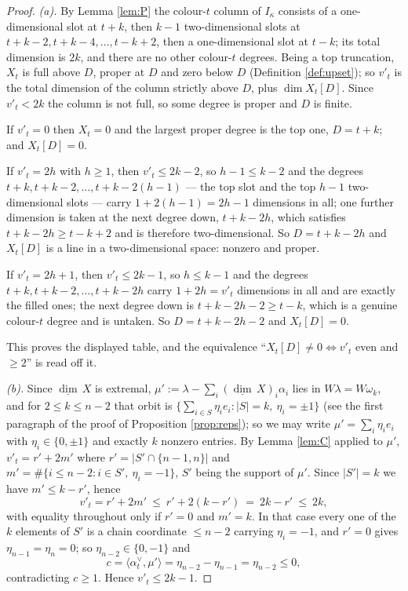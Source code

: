 \documentclass[reqno]{amsart}
\theoremstyle{plain}
\theoremstyle{definition}
\newcommand{\dimv}{\underline{\dim}\,}
\newcommand{\la}{\lambda}
\newcommand{\al}{\alpha}
\newcommand{\om}{\omega}
\newcommand{\ka}{\kappa}
\begin{document}
\begin{proof}
\emph{(a).}  By Lemma \ref{lem:P} the colour-$t$ column of $I_\ka$ consists of
a one-dimensional slot at $t+k$, then $k-1$ two-dimensional slots at
$t+k-2,t+k-4,\dots,t-k+2$, then a one-dimensional slot at $t-k$; its total
dimension is $2k$, and there are no other colour-$t$ degrees.  Being a top
truncation, $X_t$ is full above $D$, proper at $D$ and zero below $D$
(Definition \ref{def:upset}); so $v'_t$ is the total dimension of the column
strictly above $D$, plus $\dim X_t[D]$.  Since $v'_t<2k$ the column is not
full, so some degree is proper and $D$ is finite.

If $v'_t=0$ then $X_t=0$ and the largest proper degree is the top one,
$D=t+k$; and $X_t[D]=0$.

If $v'_t=2h$ with $h\ge1$, then $v'_t\le2k-2$, so $h-1\le k-2$ and the degrees
$t+k,t+k-2,\dots,t+k-2(h-1)$ --- the top slot and the top $h-1$
two-dimensional slots --- carry $1+2(h-1)=2h-1$ dimensions in all; one further
dimension is taken at the next degree down, $t+k-2h$, which satisfies
$t+k-2h\ge t-k+2$ and is therefore two-dimensional.  So $D=t+k-2h$ and
$X_t[D]$ is a line in a two-dimensional space: nonzero and proper.

If $v'_t=2h+1$, then $v'_t\le2k-1$, so $h\le k-1$ and the degrees
$t+k,t+k-2,\dots,t+k-2h$ carry $1+2h=v'_t$ dimensions in all and are exactly
the filled ones; the next degree down is $t+k-2h-2\ge t-k$, which is a genuine
colour-$t$ degree and is untaken.  So $D=t+k-2h-2$ and $X_t[D]=0$.

This proves the displayed table, and the equivalence
``$X_t[D]\ne0\iff v'_t$ even and $\ge2$'' is read off it.

\emph{(b).}  Since $\dimv X$ is extremal, $\mu':=\la-\sum_i(\dimv X)_i\al_i$
lies in $W\la=W\om_k$, and for $2\le k\le n-2$ that orbit is
$\{\sum_{i\in S}\eta_ie_i:|S|=k,\ \eta_i=\pm1\}$ (see the first paragraph of
the proof of Proposition \ref{prop:reps}); so we may write
$\mu'=\sum_i\eta_ie_i$ with $\eta_i\in\{0,\pm1\}$ and exactly $k$ nonzero
entries.  By Lemma \ref{lem:C} applied to
$\mu'$, $v'_t=r'+2m'$ where $r'=|S'\cap\{n-1,n\}|$ and
$m'=\#\{i\le n-2: i\in S',\ \eta_i=-1\}$, $S'$ being the support of $\mu'$.
Since $|S'|=k$ we have $m'\le k-r'$, hence
\[
   v'_t=r'+2m'\ \le\ r'+2(k-r')\ =\ 2k-r'\ \le\ 2k ,
\]
with equality throughout only if $r'=0$ and $m'=k$.  In that case every one of
the $k$ elements of $S'$ is a chain coordinate $\le n-2$ carrying
$\eta_i=-1$, and $r'=0$ gives $\eta_{n-1}=\eta_n=0$; so $\eta_{n-2}\in\{0,-1\}$
and
\[
   c=\langle\al_t^\vee,\mu'\rangle=\eta_{n-2}-\eta_{n-1}=\eta_{n-2}\le0 ,
\]
contradicting $c\ge1$.  Hence $v'_t\le2k-1$.
\end{proof}
\end{document}
